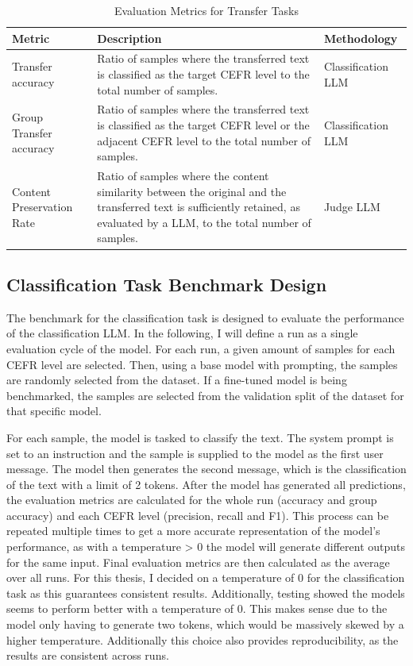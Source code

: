 \begin{table}[ht]
    \centering
    \begin{tabular}{
        >{\raggedright\arraybackslash}p{2cm}
        >{\raggedright\arraybackslash}p{7cm}
        >{\centering\arraybackslash}p{4cm}
        }
        \toprule
        \textbf{Metric} & \textbf{Description} & \textbf{Methodology} \\
        \midrule
        Transfer accuracy & Ratio of samples where the transferred text is classified as the target CEFR level to the total number of samples. & Classification LLM \\
        \midrule
        Group Transfer accuracy & Ratio of samples where the transferred text is classified as the target CEFR level or the adjacent CEFR level to the total number of samples. & Classification LLM \\
        \midrule
        Content Preservation Rate & Ratio of samples where the content similarity between the original and the transferred text is sufficiently retained, as evaluated by a LLM, to the total number of samples. & Judge LLM \\  \bottomrule
    \end{tabular}
    \caption{Evaluation Metrics for Transfer Tasks}
    \label{tab:evaluation_metrics}
\end{table}

\subsection{Classification Task Benchmark Design}
\label{ss:benchmark_design}
The benchmark for the classification task is designed to evaluate the performance of the classification LLM. In the following, I will define a run as a single evaluation cycle of the model. For each run, a given amount of samples for each CEFR level are selected. Then, using a base model with prompting, the samples are randomly selected from the dataset. If a fine-tuned model is being benchmarked, the samples are selected from the validation split of the dataset for that specific model.

For each sample, the model is tasked to classify the text. The system prompt is set to an instruction and the sample is supplied to the model as the first user message. The model then generates the second message, which is the classification of the text with a limit of 2 tokens.
After the model has generated all predictions, the evaluation metrics are calculated for the whole run (accuracy and group accuracy) and each CEFR level (precision, recall and F1). This process can be repeated multiple times to get a more accurate representation of the model's performance, as with a temperature > 0 the model will generate different outputs for the same input. Final evaluation metrics are then calculated as the average over all runs. For this thesis, I decided on a temperature of 0 for the classification task as this guarantees consistent results. Additionally, testing showed the models seems to perform better with a temperature of 0. This makes sense due to the model only having to generate two tokens, which would be massively skewed by a higher temperature. Additionally this choice also provides reproducibility, as the results are consistent across runs.

